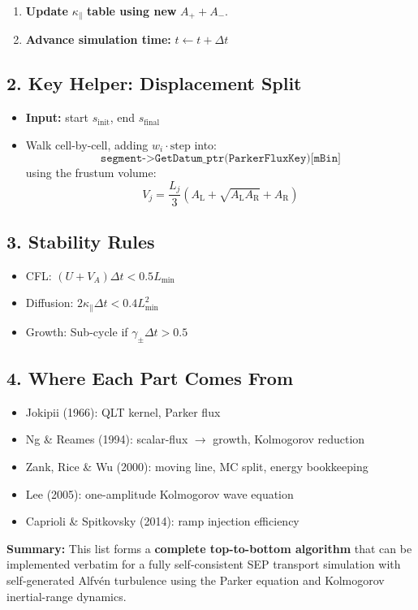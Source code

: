 \begin{enumerate}
    \item \textbf{Update } $\kappa_\parallel$ \textbf{ table using new } $A_+ + A_-$.
    
    \item \textbf{Advance simulation time:} $t \leftarrow t + \Delta t$
\end{enumerate}

\subsection*{2. Key Helper: Displacement Split}

\begin{itemize}
    \item \textbf{Input:} start $s_{\text{init}}$, end $s_{\text{final}}$
    \item Walk cell-by-cell, adding $w_i \cdot \text{step}$ into:
    \[
    \texttt{segment->GetDatum\_ptr(ParkerFluxKey)[mBin]}
    \]
    using the frustum volume:
    \[
    V_j = \frac{L_j}{3} \left( A_{\text{L}} + \sqrt{A_{\text{L}} A_{\text{R}}} + A_{\text{R}} \right)
    \]
\end{itemize}

\subsection*{3. Stability Rules}

\begin{itemize}
    \item CFL: \quad $(U + V_A) \Delta t < 0.5 L_{\min}$
    \item Diffusion: \quad $2 \kappa_\parallel \Delta t < 0.4 L_{\min}^2$
    \item Growth: \quad Sub-cycle if $\gamma_\pm \Delta t > 0.5$
\end{itemize}

\subsection*{4. Where Each Part Comes From}

\begin{itemize}
    \item Jokipii (1966): QLT kernel, Parker flux
    \item Ng \& Reames (1994): scalar-flux $\to$ growth, Kolmogorov reduction
    \item Zank, Rice \& Wu (2000): moving line, MC split, energy bookkeeping
    \item Lee (2005): one-amplitude Kolmogorov wave equation
    \item Caprioli \& Spitkovsky (2014): ramp injection efficiency
\end{itemize}

\bigskip

\noindent
\textbf{Summary:} This list forms a \textbf{complete top-to-bottom algorithm} that can be implemented verbatim for a fully self-consistent SEP transport simulation with self-generated Alfvén turbulence using the Parker equation and Kolmogorov inertial-range dynamics.
